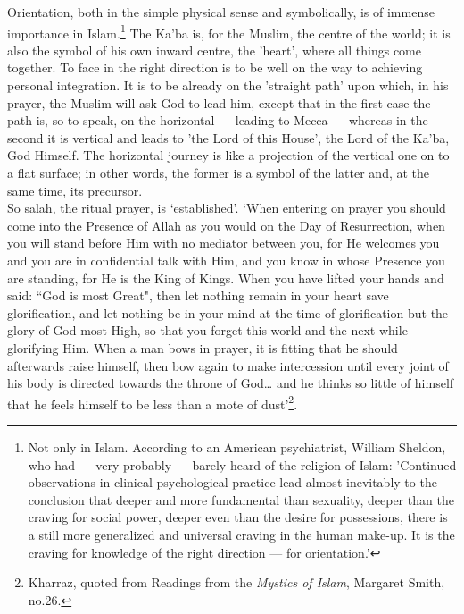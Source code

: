 \documentclass[10pt, twoside,openright]{book}
\begin{document}
Orientation, both in the simple physical sense and symbolically, is of immense importance in Islam.\footnote{Not only in Islam. According to an American psychiatrist, William Sheldon, who had --- very probably --- barely heard of the religion of Islam: 'Continued observations in clinical psychological practice 
lead almost inevitably to the conclusion that deeper and more fundamental than sexuality, deeper than 
the craving for social power, deeper even than the desire for possessions, there is a still more 
generalized and universal craving in the human make\hyp{}up. It is the craving for knowledge of the right 
direction --- for orientation.'} The Ka'ba is, for the Muslim, the centre of the world; it is also the symbol of his own inward 
centre, the 'heart', where all things come together. To face in the right direction is to be well on 
the way to achieving personal integration. It is to be already on the 'straight path' upon which, in 
his prayer, the Muslim will ask God to lead him, except that in the first case the path is, so to 
speak, on the horizontal --- leading to Mecca --- whereas in the second it is vertical and leads to 'the 
Lord of this House', the Lord of the Ka'ba, God Himself. The horizontal journey is like a projection 
of the vertical one on to a flat surface; in other words, the former is a symbol of the latter and, 
at the same time, its precursor. \\

So salah, the ritual prayer, is `established'. `When entering on prayer you should come into the 
Presence of Allah as you would on the Day of Resurrection, when you will stand before Him with no 
mediator between you, for He welcomes you and you are in confidential talk with Him, and you know in 
whose Presence you are standing, for He is the King of Kings. When you have lifted your hands and 
said: ``God is most Great", then let nothing remain in your heart save glorification, and let nothing 
be in your mind at the time of glorification but the glory of God most High, so that you forget this 
world and the next while glorifying Him. When a man bows in prayer, it is fitting that he should 
afterwards raise himself, then bow again to make intercession until every joint of his body is 
directed towards the throne of God\ldots{} and he thinks so little of himself that he feels himself to be 
less than a mote of dust'\footnote{Kharraz, quoted from Readings from the \emph{Mystics of Islam}, Margaret Smith, no.26.}.\\
\end{document}
